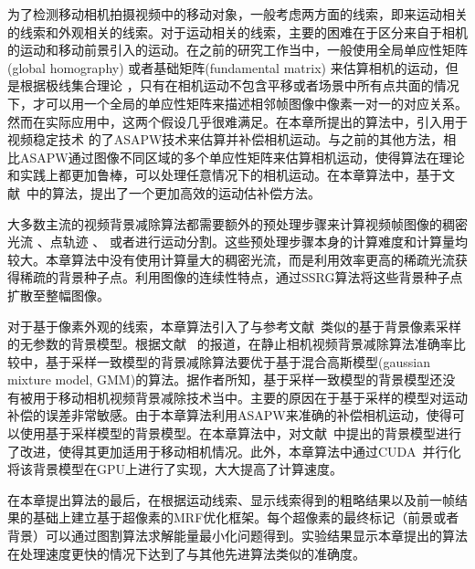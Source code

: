 为了检测移动相机拍摄视频中的移动对象，一般考虑两方面的线索，即来运动相关的线索和外观相关的线索。对于运动相关的线索，主要的困难在于区分来自于相机的运动和移动前景引入的运动。在之前的研究工作当中，一般使用全局单应性矩阵(global homography)\cite{5.8s,LiuCVPR09} 或者基础矩阵(fundamental matrix) \cite{kwak2011Generalized,LimPRFloating}来估算相机的运动，但是根据极线集合理论 \cite{Multitransform}，只有在相机运动不包含平移或者场景中所有点共面的情况下，才可以用一个全局的单应性矩阵来描述相邻帧图像中像素一对一的对应关系。然而在实际应用中，这两个假设几乎很难满足。在本章所提出的算法中，引入用于视频稳定技术\cite{Liu2009ASAP,Liu_2013ASAP} 的了ASAPW技术来估算并补偿相机运动。与之前的其他方法，相比ASAPW通过图像不同区域的多个单应性矩阵来估算相机运动，使得算法在理论和实践上都更加鲁棒，可以处理任意情况下的相机运动。在本章算法中，基于文献~中的算法，提出了一个更加高效的运动估补偿方法。\par

大多数主流的视频背景减除算法都需要额外的预处理步骤来计算视频帧图像的稠密光流 \cite{Multitransform,gbsuperpixel}、点轨迹 \cite{iccv2009,Cui2012,SubspaceTracking}、 或者进行运动分割\cite{kwak2011Generalized}。这些预处理步骤本身的计算难度和计算量均较大。本章算法中没有使用计算量大的稠密光流，而是利用效率更高的稀疏光流获得稀疏的背景种子点。利用图像的连续性特点，通过SSRG算法将这些背景种子点扩散至整幅图像。\par

对于基于像素外观的线索，本章算法引入了与参考文献~类似的基于背景像素采样的无参数的背景模型。根据文献
 ~的报道，在静止相机视频背景减除算法准确率比较中，基于采样一致模型的背景减除算法要优于基于混合高斯模型(gaussian mixture model, GMM)的算法。据作者所知，基于采样一致模型的背景模型还没有被用于移动相机视频背景减除技术当中。主要的原因在于基于采样的模型对运动补偿的误差非常敏感。由于本章算法利用ASAPW来准确的补偿相机运动，使得可以使用基于采样模型的背景模型。在本章算法中，对文献~中提出的背景模型进行了改进，使得其更加适用于移动相机情况。此外，本章算法中通过CUDA~\cite{CUDA}并行化将该背景模型在GPU上进行了实现，大大提高了计算速度。\par

 在本章提出算法的最后，在根据运动线索、显示线索得到的粗略结果以及前一帧结果的基础上建立基于超像素的MRF优化框架。每个超像素的最终标记（前景或者背景）可以通过图割算法\cite{graphcut04}求解能量最小化问题得到。实验结果显示本章提出的算法在处理速度更快的情况下达到了与其他先进算法类似的准确度。


